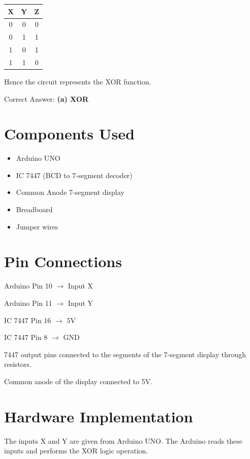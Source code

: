 \documentclass[12pt]{article}
\begin{document}
\begin{center}
\begin{tabular}{|c|c|c|}
\hline
X & Y & Z \\
\hline
0 & 0 & 0 \\
0 & 1 & 1 \\
1 & 0 & 1 \\
1 & 1 & 0 \\
\hline
\end{tabular}
\end{center}

Hence the circuit represents the XOR function.

Correct Answer: \textbf{(a) XOR}

{\color{blue}\section*{Components Used}}

\begin{itemize}
\item Arduino UNO
\item IC 7447 (BCD to 7-segment decoder)
\item Common Anode 7-segment display
\item Breadboard
\item Jumper wires
\end{itemize}

{\color{blue}\section*{Pin Connections}}

Arduino Pin 10 $\rightarrow$ Input X

Arduino Pin 11 $\rightarrow$ Input Y

IC 7447 Pin 16 $\rightarrow$ 5V

IC 7447 Pin 8 $\rightarrow$ GND

7447 output pins connected to the segments of the 7-segment display through resistors.

Common anode of the display connected to 5V.

{\color{blue}\section*{Hardware Implementation}}

The inputs X and Y are given from Arduino UNO.  
The Arduino reads these inputs and performs the XOR logic operation.
\end{document}
